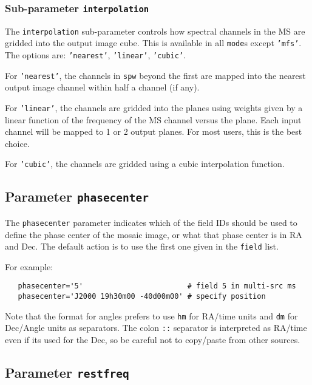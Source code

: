 \subsubsection{Sub-parameter {\tt interpolation} }
\label{section:im.pars.mode.interpolation}

The {\tt interpolation} sub-parameter controls how spectral channels
in the MS are gridded into the output image cube.  This is available 
in all {\tt mode}s except {\tt 'mfs'}.  The options are: 
{\tt 'nearest'}, {\tt 'linear'}, {\tt 'cubic'}.

For {\tt 'nearest'}, the channels in {\tt spw} beyond the first are
mapped into the nearest output image channel within half a channel (if
any).

For {\tt 'linear'}, the channels are gridded into the planes using
weights given by a linear function of the frequency of the MS channel
versus the plane.  Each input channel will be mapped to 1 or 2 output
planes.  For most users, this is the best choice.

For {\tt 'cubic'}, the channels are gridded using a cubic
interpolation function.  

\subsection{Parameter {\tt phasecenter} }
\label{section:im.pars.phasecenter}

The {\tt phasecenter} parameter indicates which of the field IDs 
should be used to define the phase center of the mosaic image,
or what that phase center is in RA and Dec.
The default action is to use the first one given in the 
{\tt field} list.

For example:
\small
\begin{verbatim}
   phasecenter='5'                        # field 5 in multi-src ms
   phasecenter='J2000 19h30m00 -40d00m00' # specify position
\end{verbatim}
\normalsize

Note that the format for angles prefers to use {\tt hm} for RA/time
units and {\tt dm} for Dec/Angle units as separators.  The colon
{\tt ::} separator is interpreted as RA/time even if its used for the
Dec, so be careful not to copy/paste from other sources.

\subsection{Parameter {\tt restfreq} }
\label{section:im.pars.restfreq}

